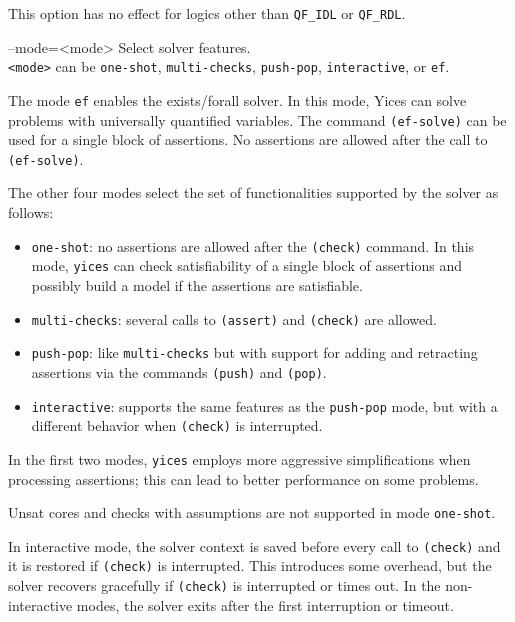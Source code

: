 \documentclass[11pt,twoside,fleqn,openright,titlepage]{cslreport}
\newenvironment{options}{
\begin{list}{}{
\setlength{\labelsep}{1.8ex}
\setlength{\labelwidth}{0pt}
\setlength{\itemindent}{-0.5\leftmargin}
\settowidth{\leftmargin}{\texttt{--}}
\renewcommand{\makelabel}{\optionlabel}}}
{\end{list}}
\newcommand*\optionlabel[1]{\hspace\labelsep\texttt{#1}}
\begin{document}
\begin{options}
  This option has no effect  for logics other than \texttt{QF\_IDL} or
  \texttt{QF\_RDL}.

\item[--mode=<mode>] Select solver features.\\[1mm]
  \texttt{<mode>} can be \texttt{one-shot}, \texttt{multi-checks},
  \texttt{push-pop}, \texttt{interactive}, or \texttt{ef}.

  The mode \texttt{ef} enables the exists/forall solver. In this mode,
  Yices can solve problems  with universally quantified variables. The
  command  \texttt{(ef-solve)}  can be  used  for  a single  block  of
  assertions.    No  assertions   are  allowed   after  the   call  to
  \texttt{(ef-solve)}.

  The other four modes select the set of functionalities supported by
  the solver as follows:
  \begin{itemize}
  \item   \texttt{one-shot}:   no   assertions   are   allowed   after
    the \texttt{(check)} command. In this mode, \texttt{yices} can
    check satisfiability of a single block of assertions and possibly
    build a model if the assertions are satisfiable.
  \item \texttt{multi-checks}: several  calls to \texttt{(assert)} and
    \texttt{(check)} are allowed.
  \item \texttt{push-pop}: like \texttt{multi-checks} but with support
    for   adding   and   retracting   assertions  via   the   commands
    \texttt{(push)} and \texttt{(pop)}.
  \item  \texttt{interactive}:  supports  the  same  features  as  the
    \texttt{push-pop}  mode,  but  with   a  different  behavior  when
    \texttt{(check)} is interrupted.
  \end{itemize}
  In  the  first  two  modes, \texttt{yices}  employs  more  aggressive
  simplifications when processing assertions;  this can lead to better
  performance on some problems.

  Unsat cores and checks with assumptions are not supported in mode
  \texttt{one-shot}.

  In interactive mode,  the solver context is saved  before every call
  to  \texttt{(check)}  and  it  is restored  if  \texttt{(check)}  is
  interrupted. This introduces some  overhead, but the solver recovers
  gracefully if  \texttt{(check)} is interrupted or times  out. In the
  non-interactive modes, the solver exits after the first interruption
  or timeout.


\end{options}
\end{document}
